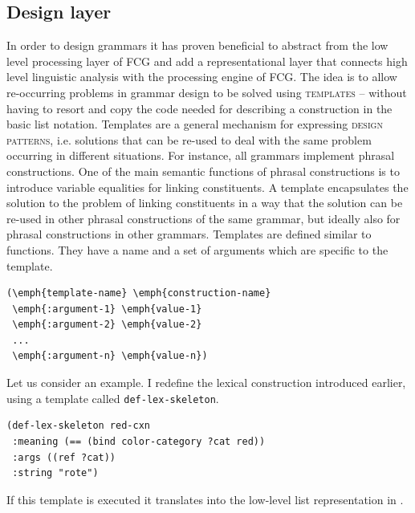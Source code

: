 \subsection{Design layer}
In order to design grammars it has proven beneficial
to abstract from the low level processing layer of FCG and 
add a representational layer that connects high level linguistic 
analysis with the processing engine of FCG.
The idea is to allow re-occurring problems in grammar design
to be solved using \textsc{templates} -- without having
to resort and copy the code needed for describing a construction
in the basic list notation. Templates 
are a general mechanism for expressing \textsc{design patterns},
i.e. solutions that can be re-used to deal with the
same problem occurring in different situations. For instance,
all grammars implement phrasal constructions. One 
of the main semantic functions of phrasal constructions 
is to introduce variable equalities for linking constituents.
A template encapsulates the solution to the problem 
of linking constituents in a way that the solution can be re-used in other
phrasal constructions of the same grammar, but ideally also for phrasal constructions in other grammars.
Templates are defined similar to functions. They
have a name and a set of arguments which are specific
to the template.
\ea\label{e:template-syntax}
\begin{lstlisting}
(\emph{template-name} \emph{construction-name}
 \emph{:argument-1} \emph{value-1}
 \emph{:argument-2} \emph{value-2}
 ...
 \emph{:argument-n} \emph{value-n})
\end{lstlisting}\z

Let us consider an example. I redefine the lexical construction introduced earlier,
using a template called 
{\footnotesize\tt def-lex-skeleton}.
\ea\label{e:def-lex-rot}
\begin{lstlisting}
(def-lex-skeleton red-cxn 
 :meaning (== (bind color-category ?cat red)) 
 :args ((ref ?cat))
 :string "rote")
\end{lstlisting}\z
If this template is executed it translates into the 
low-level list representation in . 

